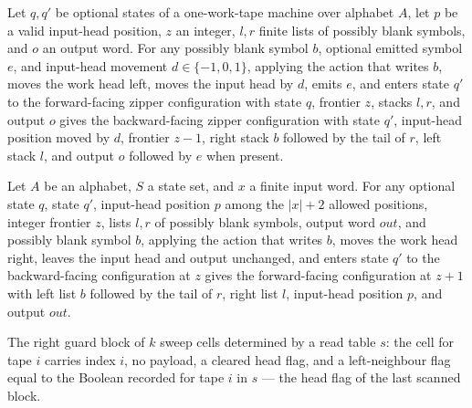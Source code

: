 \begin{lemma}
\label{Turing.FinTM.sweep_turn_left}
\leanok
{}
Let $q,q'$ be optional states of a one-work-tape machine over alphabet $A$, let $p$ be a
valid input-head position, $z$ an integer, $l,r$ finite lists of possibly blank symbols,
and $o$ an output word. For any possibly blank symbol $b$, optional emitted symbol $e$,
and input-head movement $d\in\{-1,0,1\}$, applying the action that writes $b$, moves the
work head left, moves the input head by $d$, emits $e$, and enters state $q'$ to the
forward-facing zipper configuration with state $q$, frontier $z$, stacks $l,r$, and
output $o$ gives the backward-facing zipper configuration with state $q'$, input-head
position moved by $d$, frontier $z-1$, right stack $b$ followed by the tail of $r$, left
stack $l$, and output $o$ followed by $e$ when present.
\end{lemma}

\begin{lemma}
\label{Turing.FinTM.sweep_turn_right}
\leanok
{}
Let $A$ be an alphabet, $S$ a state set, and $x$ a finite input word. For any optional
state $q$, state $q'$, input-head position $p$ among the $|x|+2$ allowed positions,
integer frontier $z$, lists $l,r$ of possibly blank symbols, output word $out$, and
possibly blank symbol $b$, applying the action that writes $b$, moves the work head
right, leaves the input head and output unchanged, and enters state $q'$ to the
backward-facing configuration at $z$ gives the forward-facing configuration at $z+1$
with left list $b$ followed by the tail of $r$, right list $l$, input-head position $p$,
and output $out$.
\end{lemma}

\begin{definition}
\label{Turing.FinTM.rightRow}
\leanok
{}
The right guard block of $k$ sweep cells determined by a read table $s$: the cell for
tape $i$ carries index $i$, no payload, a cleared head flag, and a left-neighbour flag
equal to the Boolean recorded for tape $i$ in $s$ — the head flag of the last scanned
block.
\end{definition}


